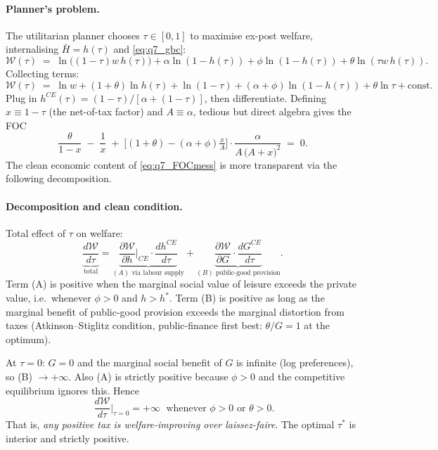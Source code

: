 \documentclass[11pt,a4paper]{article}
\begin{document}
\paragraph{Planner's problem.}
The utilitarian planner chooses $\tau\in[0,1]$ to maximise ex-post welfare, internalising $\bar H=h(\tau)$ and \eqref{eq:q7_gbc}:
\begin{equation}
\mathcal{W}(\tau)\;=\;\ln\bigl((1-\tau)w\,h(\tau)\bigr)+\alpha\ln(1-h(\tau))+\phi\ln(1-h(\tau))+\theta\ln(\tau w\,h(\tau)).
\label{eq:q7_W}
\end{equation}
Collecting terms:
\begin{equation}
\mathcal{W}(\tau)\;=\;\ln w+(1+\theta)\ln h(\tau)+\ln(1-\tau)+(\alpha+\phi)\ln(1-h(\tau))+\theta\ln\tau+\text{const}.
\label{eq:q7_W2}
\end{equation}
Plug in $h^{CE}(\tau)=(1-\tau)/[\alpha+(1-\tau)]$, then differentiate. Defining $x\equiv 1-\tau$ (the net-of-tax factor) and $A\equiv\alpha$, tedious but direct algebra gives the FOC
\begin{equation}
\frac{\theta}{1-x}\;-\;\frac{1}{x}\;+\;\bigl[(1+\theta)-( \alpha+\phi)\tfrac{x}{A}\bigr]\cdot\frac{\alpha}{A\,\bigl(A+x\bigr)^{2}}\;=\;0.
\label{eq:q7_FOCmess}
\end{equation}
The clean economic content of \eqref{eq:q7_FOCmess} is more transparent via the following decomposition.

\paragraph{Decomposition and clean condition.}
Total effect of $\tau$ on welfare:
\begin{equation}
\underbrace{\frac{d\mathcal{W}}{d\tau}}_{\text{total}}
=\underbrace{\frac{\partial\mathcal{W}}{\partial h}\bigg|_{CE}\cdot\frac{dh^{CE}}{d\tau}}_{(A)\text{ via labour supply}}
+\underbrace{\frac{\partial\mathcal{W}}{\partial G}\cdot\frac{dG^{CE}}{d\tau}}_{(B)\text{ public-good provision}}.
\label{eq:q7_decomp}
\end{equation}
Term (A) is positive when the marginal social value of leisure exceeds the private value, i.e.\ whenever $\phi>0$ and $h>h^{*}$. Term (B) is positive as long as the marginal benefit of public-good provision exceeds the marginal distortion from taxes (Atkinson--Stiglitz condition, public-finance first best: $\theta/G=1$ at the optimum).

At $\tau=0$: $G=0$ and the marginal social benefit of $G$ is infinite (log preferences), so (B) $\to+\infty$. Also (A) is strictly positive because $\phi>0$ and the competitive equilibrium ignores this. Hence
\begin{equation}
\boxed{\;\frac{d\mathcal{W}}{d\tau}\bigg|_{\tau=0}=+\infty\;\text{ whenever }\phi>0\text{ or }\theta>0.}
\label{eq:q7_result1}
\end{equation}
That is, \emph{any positive tax is welfare-improving over laissez-faire}. The optimal $\tau^{*}$ is interior and strictly positive.
\end{document}

